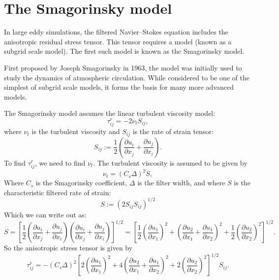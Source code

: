 \documentclass[11pt,a4paper]{article}
\begin{document}
\section{The Smagorinsky model}
In large eddy simulations, the filtered Navier--Stokes equation includes the anisotropic residual stress tensor. This tensor requires a model (known as a subgrid scale model). The first such model is known as the Smagorinsky model.

First proposed by Joseph Smagorinsky in 1963, the model was initially used to study the dynamics of atmospheric circulation. While considered to be one of the simplest of subgrid scale models, it forms the basis for many more advanced  models. 

The Smagorinsky model assumes the linear turbulent viscosity model:
$$\tau_{ij}^r = -2\nu_t {S}_{ij},$$
where $\nu_t$ is the turbulent viscosity and $S_{ij}$ is the rate of strain tensor:
$${S}_{ij} := \frac{1}{2}\left( \frac{\partial {u}_i}{\partial x_j} + \frac{\partial {u}_j}{\partial x_i}\right).$$
To find $\tau_{ij}^r$, we need to find $\nu_t$. The turbulent viscosity is assumed to be given by
$$\nu_t = (C_s \Delta)^2 {S},$$
Where $C_s$ is the Smagorinsky coefficient, $\Delta$ is the filter width, and where ${S}$ is the characteristic filtered rate of strain:
$${S} := \left(2{S}_{ij}{S}_{ij}\right)^{1/2}$$
Which we can write out as:
$${S} = \left[\frac{1}{2}\left( \frac{\partial {u}_i}{\partial x_j} + \frac{\partial {u}_j}{\partial x_i}\right)\left( \frac{\partial {u}_i}{\partial x_j} + \frac{\partial {u}_j}{\partial x_i}\right)\right]^{1/2} = \left[\frac{1}{2}\left( \frac{\partial {u}_1}{\partial x_1}\right)^2+\left( \frac{\partial {u}_2}{\partial x_1} + \frac{\partial {u}_1}{\partial x_2}\right)^2+\frac{1}{2}\left( \frac{\partial {u}_2}{\partial x_2}\right)^2 \right]^{1/2}.$$
So the anisotropic stress tensor is given by
\begin{equation}\label{smagTau}
\tau_{ij}^r = -(C_s \Delta)^2\left[2\left( \frac{\partial {u}_1}{\partial x_1}\right)^2+4\left( \frac{\partial {u}_2}{\partial x_1} + \frac{\partial {u}_1}{\partial x_2}\right)^2+2\left( \frac{\partial {u}_2}{\partial x_2}\right)^2 \right]^{1/2}{S}_{ij}.
\end{equation}
\end{document}
